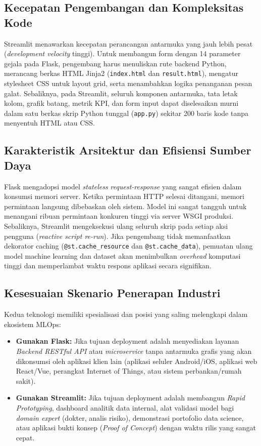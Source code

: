 \documentclass[a4paper,oneside,12pt]{report}
\begin{document}
\subsection{Kecepatan Pengembangan dan Kompleksitas Kode}
Streamlit menawarkan kecepatan perancangan antarmuka yang jauh lebih pesat (\textit{development velocity} tinggi). Untuk membangun form dengan 14 parameter gejala pada Flask, pengembang harus menuliskan rute backend Python, merancang berkas HTML Jinja2 (\texttt{index.html} dan \texttt{result.html}), mengatur stylesheet CSS untuk layout grid, serta menambahkan logika penanganan pesan galat. Sebaliknya, pada Streamlit, seluruh komponen antarmuka, tata letak kolom, grafik batang, metrik KPI, dan form input dapat diselesaikan murni dalam satu berkas skrip Python tunggal (\texttt{app.py}) sekitar 200 baris kode tanpa menyentuh HTML atau CSS.

\subsection{Karakteristik Arsitektur dan Efisiensi Sumber Daya}
Flask mengadopsi model \textit{stateless request-response} yang sangat efisien dalam konsumsi memori server. Ketika permintaan HTTP selesai ditangani, memori permintaan langsung dibebaskan oleh sistem. Model ini sangat tangguh untuk menangani ribuan permintaan konkuren tinggi via server WSGI produksi. Sebaliknya, Streamlit mengeksekusi ulang seluruh skrip pada setiap aksi pengguna (\textit{reactive script re-run}). Jika pengembang tidak memanfaatkan dekorator caching (\texttt{@st.cache\_resource} dan \texttt{@st.cache\_data}), pemuatan ulang model machine learning dan dataset akan menimbulkan \textit{overhead} komputasi tinggi dan memperlambat waktu respons aplikasi secara signifikan.

\subsection{Kesesuaian Skenario Penerapan Industri}
Kedua teknologi memiliki spesialisasi dan posisi yang saling melengkapi dalam ekosistem MLOps:
\begin{itemize}[noitemsep, topsep=2pt, parsep=1pt]
	\item \textbf{Gunakan Flask:} Jika tujuan deployment adalah menyediakan layanan \textit{Backend RESTful API} atau \textit{microservice} tanpa antarmuka grafis yang akan dikonsumsi oleh aplikasi klien lain (aplikasi seluler Android/iOS, aplikasi web React/Vue, perangkat Internet of Things, atau sistem perbankan/rumah sakit).
	\item \textbf{Gunakan Streamlit:} Jika tujuan deployment adalah membangun \textit{Rapid Prototyping}, dashboard analitik data internal, alat validasi model bagi \textit{domain expert} (dokter, analis risiko), demonstrasi portofolio data science, atau aplikasi bukti konsep (\textit{Proof of Concept}) dengan waktu rilis yang sangat cepat.
\end{itemize}
\end{document}
